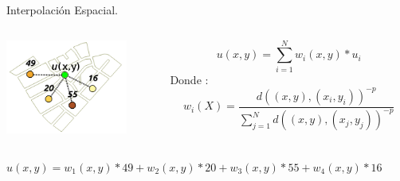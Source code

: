 \begin{frame}[t]{Interpolación Espacial.}
  \begin{center}
   \begin{columns}[T]
        \begin{column}[T]{3.5cm}
            \includegraphics[width=4cm]{./graphics/interpolacion-ej.png}
        \end{column}
        \begin{column}[T]{7cm}
        \begin{equation}\label{eq:interpolacion-idw}
         u(x,y) = \sum_{i=1}^{N} w_i(x,y) * u_{i}
        \end{equation}
        Donde :
        \begin{equation}
        w_i(X) =  \dfrac{d((x,y), (x_i,y_i))^{-p}}{\sum_{j=1}^{N} d((x,y), (x_j,y_j))^{-p}}
        \end{equation}
        \end{column}
    \end{columns}
  \end{center}
    $u(x,y) = w_1(x,y) * 49 + w_2(x,y) * 20 + w_3(x,y) * 55 + w_4(x,y) * 16 $
\end{frame}

